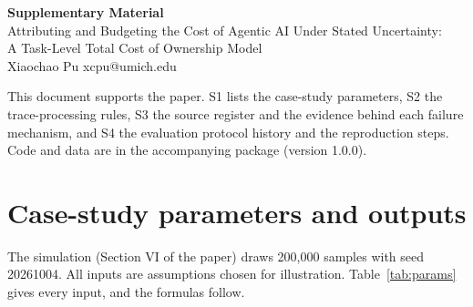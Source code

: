 \documentclass[10pt]{article}
\begin{document}
\begin{center}
{\Large\bfseries Supplementary Material}\\[4pt]
{\large Attributing and Budgeting the Cost of Agentic AI Under Stated Uncertainty:\\ A Task-Level Total Cost of Ownership Model}\\[6pt]
Xiaochao Pu \quad xcpu@umich.edu
\end{center}

This document supports the paper. S1 lists the case-study parameters, S2 the trace-processing rules, S3 the source register and the evidence behind each failure mechanism, and S4 the evaluation protocol history and the reproduction steps. Code and data are in the accompanying package (version 1.0.0).

\section{Case-study parameters and outputs}
The simulation (Section VI of the paper) draws 200{,}000 samples with seed 20261004. All inputs are assumptions chosen for illustration. Table~\ref{tab:params} gives every input, and the formulas follow.
\end{document}
